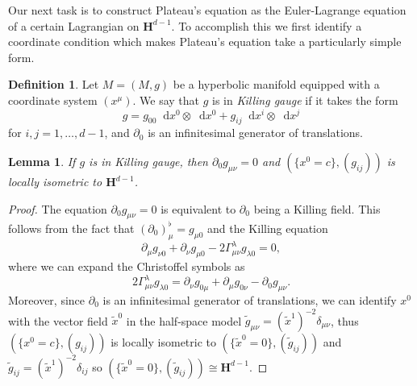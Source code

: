 \documentclass[reqno,12pt,letterpaper]{amsart}
\newcommand{\Hyp}{\mathbf H}
\newcommand*\dif{\mathop{}\!\mathrm{d}}
\newcommand{\dfn}[1]{\emph{#1}\index{#1}}
\newtheorem{lemma}[theorem]{Lemma}
\theoremstyle{definition}
\newtheorem{definition}[theorem]{Definition}
\numberwithin{equation}{section}
\begin{document}

Our next task is to construct Plateau's equation as the Euler-Lagrange equation of a certain Lagrangian on $\Hyp^{d - 1}$.
To accomplish this we first identify a coordinate condition which makes Plateau's equation take a particularly simple form.

\begin{definition}
Let $M = (M, g)$ be a hyperbolic manifold equipped with a coordinate system $(x^\mu)$.
We say that $g$ is in \dfn{Killing gauge} if it takes the form 
$$g = g_{00} \dif x^0 \otimes \dif x^0 + g_{ij} \dif x^i \otimes \dif x^j$$
for $i, j = 1, \dots, d - 1$, and $\partial_0$ is an infinitesimal generator of translations.
\end{definition}

\begin{lemma}
If $g$ is in Killing gauge, then $\partial_0 g_{\mu\nu} = 0$ and $(\{x^0 = c\}, (g_{ij}))$ is locally isometric to $\Hyp^{d - 1}$.
\end{lemma}
\begin{proof}
The equation $\partial_0 g_{\mu\nu} = 0$ is equivalent to $\partial_0$ being a Killing field. This follows from the fact that $(\partial_0)^\flat_\mu = g_{\mu 0}$ and the Killing equation 
$$\partial_\mu g_{\nu 0} + \partial_\nu g_{\mu 0} - 2\Gamma_{\mu \nu}^\lambda g_{\lambda 0} = 0,$$
where we can expand the Christoffel symbols as
$$2 \Gamma^\lambda_{\mu \nu} g_{\lambda 0} = \partial_\nu g_{0 \mu} + \partial_\mu g_{0 \nu} - \partial_0 g_{\mu \nu}.$$
Moreover, since $\partial_0$ is an infinitesimal generator of translations, we can identify $x^0$ with the vector field $\tilde x^0$ in the half-space model $\tilde g_{\mu\nu} = (\tilde x^1)^{-2} \delta_{\mu\nu}$, thus $(\{x^0 = c\}, (g_{ij}))$ is locally isometric to $(\{\tilde x^0 = 0\}, (\tilde g_{ij}))$ and $\tilde g_{ij} = (\tilde x^1)^{-2} \delta_{ij}$ so $(\{\tilde x^0 = 0\}, (\tilde g_{ij})) \cong \Hyp^{d - 1}$.
\end{proof}
\end{document}
